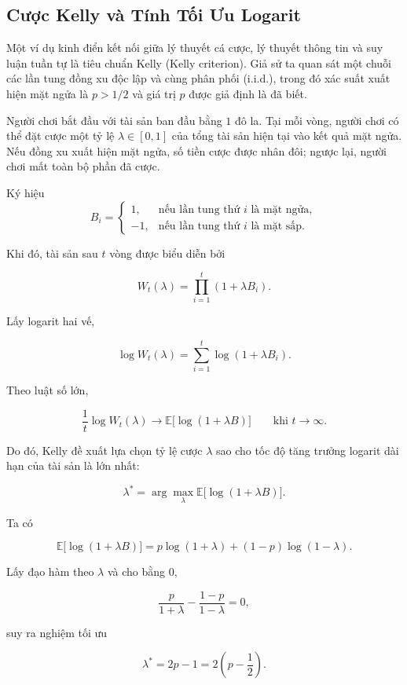 \subsection{Cược Kelly và Tính Tối Ưu Logarit}

Một ví dụ kinh điển kết nối giữa lý thuyết cá cược, lý thuyết thông tin và suy luận tuần tự là tiêu chuẩn Kelly (Kelly criterion). Giả sử ta quan sát một chuỗi các lần tung đồng xu độc lập và cùng phân phối (i.i.d.), trong đó xác suất xuất hiện mặt ngửa là $p > 1/2$ và giá trị $p$ được giả định là đã biết.

Người chơi bắt đầu với tài sản ban đầu bằng $1$ đô la. Tại mỗi vòng, người chơi có thể đặt cược một tỷ lệ $\lambda \in [0,1]$ của tổng tài sản hiện tại vào kết quả mặt ngửa. Nếu đồng xu xuất hiện mặt ngửa, số tiền cược được nhân đôi; ngược lại, người chơi mất toàn bộ phần đã cược.

Ký hiệu
\[
B_i =
\begin{cases}
1, & \text{nếu lần tung thứ } i \text{ là mặt ngửa},\\
-1, & \text{nếu lần tung thứ } i \text{ là mặt sấp}.
\end{cases}
\]

Khi đó, tài sản sau $t$ vòng được biểu diễn bởi

\[
W_t(\lambda)
=
\prod_{i=1}^{t}
\left(1+\lambda B_i\right).
\]

Lấy logarit hai vế,

\[
\log W_t(\lambda)
=
\sum_{i=1}^{t}
\log\left(1+\lambda B_i\right).
\]

Theo luật số lớn,

\[
\frac{1}{t}\log W_t(\lambda)
\to
\mathbb{E}
\big[
\log(1+\lambda B)
\big]
\qquad
\text{khi }
t\to\infty.
\]

Do đó, Kelly đề xuất lựa chọn tỷ lệ cược $\lambda$ sao cho tốc độ tăng trưởng logarit dài hạn của tài sản là lớn nhất:

\[
\lambda^*
=
\arg\max_{\lambda}
\mathbb{E}
\big[
\log(1+\lambda B)
\big].
\]

Ta có

\[
\mathbb{E}
\big[
\log(1+\lambda B)
\big]
=
p\log(1+\lambda)
+
(1-p)\log(1-\lambda).
\]

Lấy đạo hàm theo $\lambda$ và cho bằng $0$,

\[
\frac{p}{1+\lambda}
-
\frac{1-p}{1-\lambda}
=
0,
\]

suy ra nghiệm tối ưu

\[
\lambda^*
=
2p-1
=
2\left(p-\frac12\right).
\]

